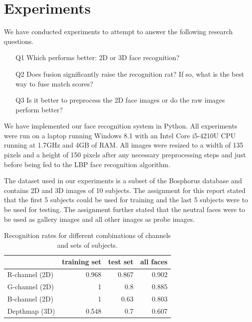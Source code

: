 \documentclass[]{article}
\begin{document}
\section{Experiments}
\graphicspath{{img/experiments/}}
We have conducted experiments to attempt to answer the following research questions.
\begin{itemize}
	\item[Q1] Which performs better: 2D or 3D face recognition?
	\item[Q2] Does fusion significantly raise the recognition rat? If so, what is the best way to fuse match scores?
	\item[Q3] Is it better to preprocess the 2D face images or do the raw images perform better?
\end{itemize}

We have implemented our face recognition system in Python. All experiments were run on a laptop running Windows 8.1 with an Intel Core i5-4210U CPU running at 1.7GHz and 4GB of RAM. All images were resized to a width of 135 pixels and a height of 150 pixels after any necessary preprocessing steps and just before being fed to the LBP face recognition algorithm.

The dataset used in our experiments is a subset of the Bosphorus database and contains 2D and 3D images of 10 subjects. The assignment for this report stated that the first 5 subjects could be used for training and the last 5 subjects were to be used for testing. The assignment further stated that the neutral faces were to be used as gallery images and all other images as probe images.

\begin{table}
	\centering
	\begin{tabular}{lrrr}
		\toprule
		& training set & test set & all faces\\
		\midrule
		R-channel (2D) & 0.968 & 0.867 & 0.902\\
		G-channel (2D) & 1 & 0.8 & 0.885 \\
		B-channel (2D) & 1 & 0.63 & 0.803 \\
		Depthmap (3D) & 0.548 & 0.7 & 0.607 \\
		\bottomrule
	\end{tabular}
	\caption{Recognition rates for different combinations of channels and sets of subjects.}
	\label{tab:traintestall}
\end{table}
\end{document}
